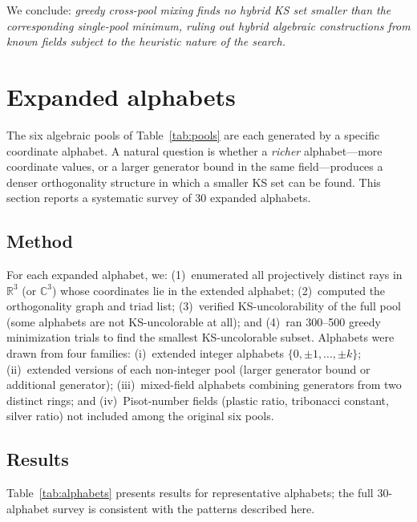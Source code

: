 \documentclass[twocolumn,pra,superscriptaddress,nofootinbib]{revtex4-2}
\newcommand{\R}{\mathbb{R}}
\newcommand{\C}{\mathbb{C}}
\begin{document}
We conclude: \textit{greedy cross-pool mixing finds no hybrid KS set smaller
than the corresponding single-pool minimum, ruling out hybrid algebraic
constructions from known fields subject to the heuristic nature of the search.}

\section{Expanded alphabets}
\label{sec:alphabets}

The six algebraic pools of Table~\ref{tab:pools} are each generated by a
specific coordinate alphabet. A natural question is whether a \emph{richer}
alphabet---more coordinate values, or a larger generator bound in the same
field---produces a denser orthogonality structure in which a smaller KS set
can be found. This section reports a systematic survey of 30 expanded alphabets.

\subsection{Method}

For each expanded alphabet, we: (1)~enumerated all projectively distinct rays in
$\R^3$ (or $\C^3$) whose coordinates lie in the extended alphabet; (2)~computed
the orthogonality graph and triad list; (3)~verified KS-uncolorability of the
full pool (some alphabets are not KS-uncolorable at all); and (4)~ran
300--500 greedy minimization trials to find the smallest KS-uncolorable subset.
Alphabets were drawn from four families: (i)~extended integer alphabets
$\{0,\pm1,\ldots,\pm k\}$; (ii)~extended versions of each non-integer pool
(larger generator bound or additional generator); (iii)~mixed-field alphabets
combining generators from two distinct rings; and (iv)~Pisot-number fields
(plastic ratio, tribonacci constant, silver ratio) not included among the
original six pools.

\subsection{Results}

Table~\ref{tab:alphabets} presents results for representative alphabets;
the full 30-alphabet survey is consistent with the patterns described here.
\end{document}

